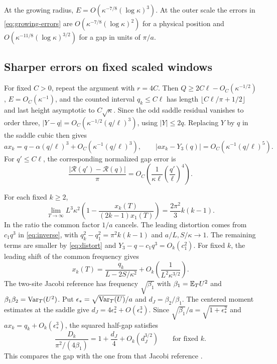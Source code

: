At the growing radius, \(E=O(\kappa^{-7/8}(\log\kappa)^3)\).
At the outer scale the errors in \eqref{eq:growing-errors} are
\(O(\kappa^{-7/8}(\log\kappa)^2)\) for a physical position and
\(O(\kappa^{-11/8}(\log\kappa)^{3/2})\) for a gap in units of \(\pi/a\).

\subsection{Sharper errors on fixed scaled windows}

For fixed \(C>0\), repeat the argument with \(r=4C\).
Then \(Q\ge2C\ell-O_C(\kappa^{-1/2})\), \(E=O_C(\kappa^{-1})\),
and the counted interval \(q_k\le C\ell\) has length
\(\lfloor C\ell/\pi+1/2\rfloor\) and last height asymptotic to
\(C\sqrt\kappa\). Since the odd saddle residual vanishes to order
three, \(|Y-q|=O_C(\kappa^{-1/2}(q/\ell)^3)\), using \(|Y|\le2q\).
Replacing \(Y\) by \(q\) in the saddle cubic then gives
\begin{equation}
 ax_k=q-\alpha(q/\ell)^3+O_C(\kappa^{-1}(q/\ell)^3),\qquad
 |ax_k-Y_3(q)|=O_C(\kappa^{-1}(q/\ell)^5).
 \label{eq:distort}
\end{equation}
For \(q'\le C\ell\), the corresponding normalized gap error is
\begin{equation}
 \frac{|\mathcal R(q')-\mathcal R(q)|}{\pi}
   =O_C\!\left(\frac{1}{\kappa\ell}
                    \left(\frac{q'}{\ell}\right)^4\right).
 \label{eq:fixed-gap}
\end{equation}

For each fixed \(k\ge2\),
\begin{equation}
 \lim_{T\to\infty}L^3\kappa^2
 \left(1-\frac{x_k(T)}{(2k-1)x_1(T)}\right)
  =\frac{2\pi^2}{3}k(k-1).
 \label{eq:shape}
\end{equation}
In the ratio the common factor \(1/a\) cancels. The leading distortion
comes from \(c_1 q^3\) in \eqref{eq:inverse}, with
\(q_k^2-q_1^2=\pi^2k(k-1)\) and \(a/L,S/\kappa\to1\).
The remaining terms are smaller by \eqref{eq:distort} and
\(Y_3-q-c_1q^3=O_k(c_1^2)\).
For fixed \(k\), the leading shift of the common frequency gives
\[
 x_k(T)=\frac{q_k}{L-2S/\kappa^2}
       +O_k\!\left(\frac{1}{L^2\kappa^{3/2}}\right).
\]
The two-site Jacobi reference has frequency \(\sqrt{\beta_1}\) with
\(\beta_1=\mathbb E_T U^2\) and \(\beta_1\beta_2=\operatorname{Var}_T(U^2)\).
Put \(\epsilon_*=\sqrt{\operatorname{Var}_T(U)}/a\) and \(d_J=\beta_2/\beta_1\).
The centered moment estimates at the saddle give
\(d_J=4\epsilon_*^2+O(\epsilon_*^3)\). Since
\(\sqrt{\beta_1}/a=\sqrt{1+\epsilon_*^2}\) and
\(ax_k=q_k+O_k(\epsilon_*^3)\), the squared half-gap satisfies
\[
 \frac{D_k}{\pi^2/(4\beta_1)}=1+\frac{d_J}{4}+O_k(d_J^{3/2})
 \qquad\text{for fixed }k .
\]
This compares the gap with the one from that Jacobi reference
\cite[\S2]{Founding07}.

